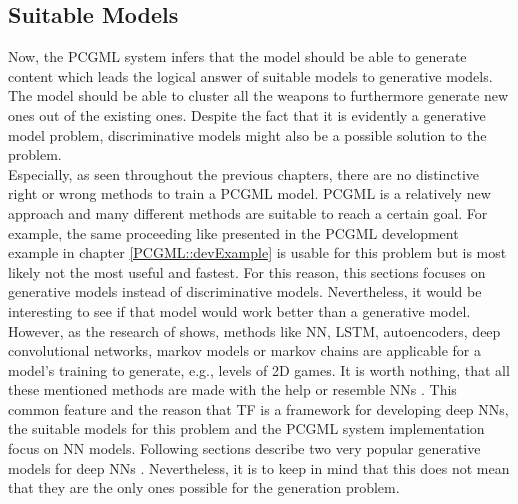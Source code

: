\documentclass[MGS,Master,english]{twbook}%
\begin{document}
\subsection{Suitable Models}
Now, the PCGML system infers that the model should be able to generate content which leads the logical answer of suitable models to generative models. The model should be able to cluster all the weapons to furthermore generate new ones out of the existing ones. Despite the fact that it is evidently a generative model problem, discriminative models might also be a possible solution to the problem.\\ 
Especially, as seen throughout the previous chapters, there are no distinctive right or wrong methods to train a PCGML model. PCGML is a relatively new approach and many different methods are suitable to reach a certain goal. For example, the same proceeding like presented in the PCGML development example in chapter \ref{PCGML::devExample} is usable for this problem but is most likely not the most useful and fastest. For this reason, this sections focuses on generative models instead of discriminative models. Nevertheless, it would be interesting to see if that model would work better than a generative model. \\
However, as the research of \cite{pcgml::paper} shows, methods like \ac{NN}, \ac{LSTM}, autoencoders, deep convolutional networks, markov models or markov chains are applicable for a model's training to generate, e.g., levels of \ac{2D} games. It is worth nothing, that all these mentioned methods are made with the help or resemble \acp{NN} \cite{neuralNetworkZoo}. This common feature and the reason that \ac{TF} is a framework for developing deep \acp{NN}, the suitable models for this problem and the PCGML system implementation focus on \ac{NN} models. Following sections describe two very popular generative models for deep \acp{NN} \cite{ml::vae::tutorial}. Nevertheless, it is to keep in mind that this does not mean that they are the only ones possible for the generation problem.
\end{document}
